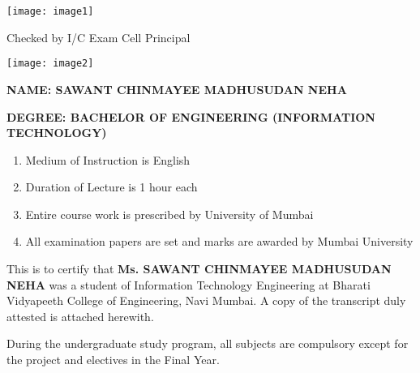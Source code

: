 \documentclass{article} %
\begin{document}


\noindent \texttt{[image: image1]}

\noindent 

\noindent Checked by    I/C Exam Cell                            Principal

\noindent \texttt{[image: image2]}

\noindent \textbf{\underbar{}}

\noindent \textbf{}

\noindent \textbf{\underbar{}}

\noindent \textbf{}

\noindent \textbf{\underbar{}}

\noindent \textbf{NAME: SAWANT CHINMAYEE MADHUSUDAN NEHA}

\noindent \textbf{}

\noindent \textbf{DEGREE: BACHELOR OF ENGINEERING (INFORMATION TECHNOLOGY)}

\noindent 

\begin{enumerate}
\item  Medium of Instruction is English

\item  Duration of Lecture is 1 hour each

\item  Entire course work is prescribed by University of Mumbai

\item  All examination papers are set and marks are awarded by Mumbai University
\end{enumerate}

\noindent 

\noindent 

\noindent This is to certify that \textbf{Ms. SAWANT CHINMAYEE MADHUSUDAN NEHA} was a student of Information Technology Engineering at Bharati Vidyapeeth College of Engineering, Navi Mumbai. A copy of the transcript duly attested is attached herewith.

\noindent 

\noindent During the undergraduate study program, all subjects are compulsory except for the project and electives in the Final Year.

\noindent 
\end{document}
